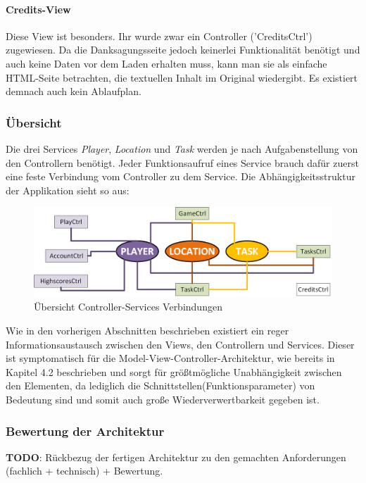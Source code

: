 \paragraph{Credits-View}
%
%
Diese View ist besonders. Ihr wurde zwar ein Controller ('CreditsCtrl') zugewiesen. Da die Danksagungsseite jedoch keinerlei Funktionalität benötigt und auch keine Daten vor dem Laden erhalten muss, kann man sie als einfache HTML-Seite betrachten, die textuellen Inhalt im Original wiedergibt. Es existiert demnach auch kein Ablaufplan.
\newpage
\subsubsection{Übersicht}
Die drei Services \emph{Player}, \emph{Location} und \emph{Task} werden je nach Aufgabenstellung von den Controllern benötigt. Jeder Funktionsaufruf eines Service brauch dafür zuerst eine feste Verbindung vom Controller zu dem Service. Die Abhängigkeitsstruktur der Applikation sieht so aus:
\begin{figure}[h]
\centering
\includegraphics[width=1\textwidth]{ref/images/controller_services.png}
\caption[Übersicht Controller-Services Verbindungen]{Übersicht Controller-Services Verbindungen}
\label{fig:Controller-Services}
\end{figure} 

Wie in den vorherigen Abschnitten beschrieben existiert ein reger Informationsaustausch zwischen den Views, den Controllern und Services. Dieser ist symptomatisch für die Model-View-Controller-Architektur, wie bereits in Kapitel 4.2 beschrieben und sorgt für größtmögliche Unabhängigkeit zwischen den Elementen, da lediglich die Schnittstellen(Funktionsparameter) von Bedeutung sind und somit auch große Wiederverwertbarkeit gegeben ist.

\subsubsection{Bewertung der Architektur}
\textbf{TODO}: Rückbezug der fertigen Architektur zu den gemachten Anforderungen (fachlich + technisch) + Bewertung.
